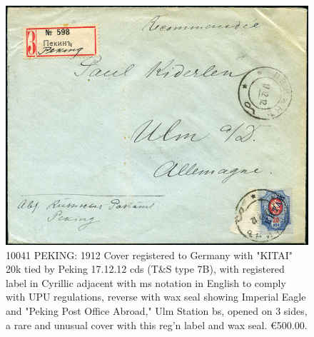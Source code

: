 \begin{figure}[htbp]
\centering
\includegraphics[width=.95\textwidth]{../russian-post-offices-in-china/10041.jpg}
\caption{
10041 PEKING: 1912 Cover registered to Germany with "KITAI" 20k tied by 
Peking 17.12.12 cds (T\&S type 7B), with registered label in Cyrillic 
adjacent with ms notation in English to comply with UPU regulations, 
reverse with wax seal showing Imperial Eagle and "Peking Post Office 
Abroad," Ulm Station bs, opened on 3 sides, a rare and unusual cover 
with this reg'n label and wax seal.
\euro 500.00. 
}  
\end{figure}   















    